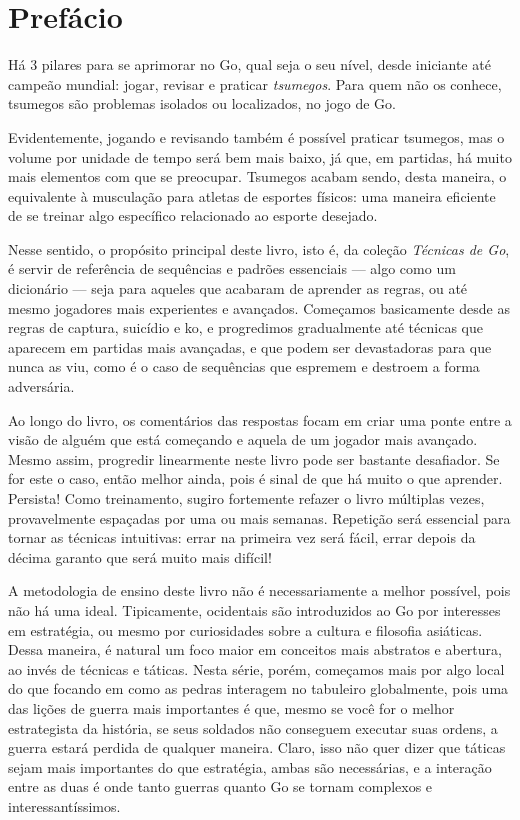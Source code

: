 \chapter{Prefácio}

Há 3 pilares para se aprimorar no Go, qual seja o seu nível, desde iniciante até campeão mundial: jogar, revisar e praticar \emph{tsumegos}. Para quem não os conhece, tsumegos são problemas isolados ou localizados, no jogo de Go.

Evidentemente, jogando e revisando também é possível praticar tsumegos, mas o volume por unidade de tempo será bem mais baixo, já que, em partidas, há muito mais elementos com que se preocupar. Tsumegos acabam sendo, desta maneira, o equivalente à musculação para atletas de esportes físicos: uma maneira eficiente de se treinar algo específico relacionado ao esporte desejado.

Nesse sentido, o propósito principal deste livro, isto é, da coleção \emph{Técnicas de Go}, é servir de referência de sequências e padrões essenciais --- algo como um dicionário --- seja para aqueles que acabaram de aprender as regras, ou até mesmo jogadores mais experientes e avançados. Começamos basicamente desde as regras de captura, suicídio e ko, e progredimos gradualmente até técnicas que aparecem em partidas mais avançadas, e que podem ser devastadoras para que nunca as viu, como é o caso de sequências que espremem e destroem a forma adversária. 

Ao longo do livro, os comentários das respostas focam em criar uma ponte entre a visão de alguém que está começando e aquela de um jogador mais avançado. Mesmo assim, progredir linearmente neste livro pode ser bastante desafiador. Se for este o caso, então melhor ainda, pois é sinal de que há muito o que aprender. Persista! Como treinamento, sugiro fortemente refazer o livro múltiplas vezes, provavelmente espaçadas por uma ou mais semanas. Repetição será essencial para tornar as técnicas intuitivas: errar na primeira vez será fácil, errar depois da décima garanto que será muito mais difícil!

A metodologia de ensino deste livro não é necessariamente a melhor possível, pois não há uma ideal. Tipicamente, ocidentais são introduzidos ao Go por interesses em estratégia, ou mesmo por curiosidades sobre a cultura e filosofia asiáticas. Dessa maneira, é natural um foco maior em conceitos mais abstratos e abertura, ao invés de técnicas e táticas. Nesta série, porém, começamos mais por algo local do que focando em como as pedras interagem no tabuleiro globalmente, pois uma das lições de guerra mais importantes é que, mesmo se você for o melhor estrategista da história, se seus soldados não conseguem executar suas ordens, a guerra estará perdida de qualquer maneira. Claro, isso não quer dizer que táticas sejam mais importantes do que estratégia, ambas são necessárias, e a interação entre as duas é onde tanto guerras quanto Go se tornam complexos e interessantíssimos.

